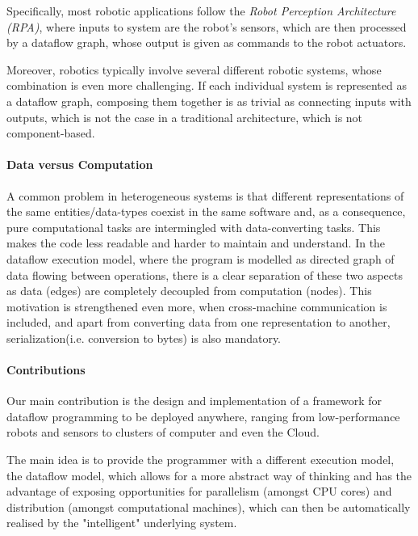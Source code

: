 \documentclass[sigplan,review,anonymous]{acmart}
\begin{document}
Specifically, most robotic applications follow the \textit{Robot Perception
Architecture (RPA)}, where inputs to system are the robot's sensors, which are
then processed by a dataflow graph, whose output is given as commands to the
robot actuators.

Moreover, robotics typically involve several different robotic systems, whose
combination is even more challenging. If each individual system is represented
as a dataflow graph, composing them together is as trivial as connecting inputs
with outputs, which is not the case in a traditional architecture, which is not
component-based.


\paragraph{Data versus Computation}

A common problem in heterogeneous systems is that different representations of
the same entities/data-types coexist in the same software and, as a consequence,
pure computational tasks are intermingled with data-converting tasks. This makes
the code less readable and harder to maintain and understand. In the dataflow
execution model, where the program is modelled as directed graph of data flowing
between operations, there is a clear separation of these two aspects as data
(edges) are completely decoupled from computation (nodes). This motivation is
strengthened even more, when cross-machine communication is included, and apart
from converting data from one representation to another, serialization(i.e.
conversion to bytes) is also mandatory.

\paragraph{Contributions}
Our main contribution is the design and implementation of a framework for
dataflow programming to be deployed anywhere, ranging from low-performance
robots and sensors to clusters of computer and even the Cloud.

The main idea is to provide the programmer with a different execution model, the
dataflow model, which allows for a more abstract way of thinking and has the
advantage of exposing opportunities for parallelism (amongst CPU cores) and
distribution (amongst computational machines), which can then be automatically
realised by the "intelligent" underlying system.
\end{document}
